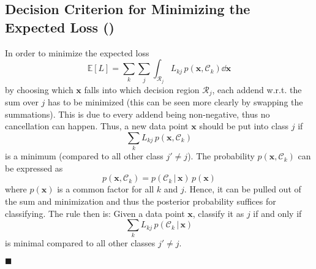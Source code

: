\documentclass[11pt, a4paper]{scrartcl}
\newcommand{\E}{\mathbb{E}}
\renewcommand{\vec}[1]{\bm{#1}}
\newcommand{\given}{\,\vert\,}
\newcommand{\eot}{\hfill\(\blacksquare\)}
\newcommand{\diffstar}{\texorpdfstring{\raisebox{-1pt}{\resizebox{!}{8pt}{\(\star\)}}}{*}}
\newcommand{\onestar}  {(\diffstar)}
\begin{document}
		\subsection{Decision Criterion for Minimizing the Expected Loss  \onestar}
			In order to minimize the expected loss
			\begin{equation}
				\E[L] = \sum_k \sum_j \int_{\mathcal{R}_j}\! L_{kj} \, p(\vec{x}, \mathcal{C}_k) \dd{\vec{x}}
			\end{equation}
			by choosing which \(\vec{x}\) falls into which decision region \(\mathcal{R}_j\), each addend w.r.t. the sum over \(j\) has to be minimized (this can be seen more clearly by swapping the summations). This is due to every addend being non-negative, thus no cancellation can happen. Thus, a new data point \(\vec{x}\) should be put into class \(j\) if
			\begin{equation}
				\sum_k L_{kj} \, p(\vec{x}, \mathcal{C}_k)
			\end{equation}
			is a minimum (compared to all other class \( j' \neq j \)). The probability \( p(\vec{x}, \mathcal{C}_k) \) can be expressed as
			\begin{equation}
				p(\vec{x}, \mathcal{C}_k) = p(\mathcal{C}_k \given \vec{x}) \, p(\vec{x})
			\end{equation}
			where \( p(\vec{x}) \) is a common factor for all \(k\) and \(j\). Hence, it can be pulled out of the sum and minimization and thus the posterior probability suffices for classifying. The rule then is: Given a data point \(\vec{x}\), classify it as \(j\) if and only if
			\begin{equation}
				\sum_k L_{kj} \, p(\mathcal{C}_k \given \vec{x})
			\end{equation}
			is minimal compared to all other classes \( j' \neq j \).

			\eot
\end{document}
